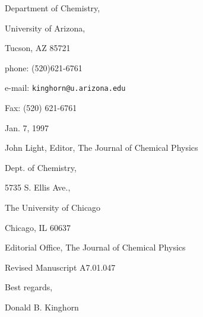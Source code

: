 \documentclass[12pt]{article}
\begin{document}
\begin{letterfrom}
\end{letterfrom}

\begin{letterfromcompany}
\end{letterfromcompany}

\begin{letterfromaddr}
Department of Chemistry,

University of Arizona,

Tucson, AZ 85721\newline

phone: (520)621-6761

e-mail: \texttt{kinghorn@u.arizona.edu}

Fax: (520) 621-6761
\end{letterfromaddr}

\begin{letterdate}
Jan. 7, 1997
\end{letterdate}

\begin{letterto}
\end{letterto}

\begin{lettertoaddr}
John Light, Editor, The Journal of Chemical Physics

Dept. of Chemistry,

5735 S. Ellis Ave.,

The University of Chicago

Chicago, IL 60637
\end{lettertoaddr}

\begin{letterattention}
Editorial Office, The Journal of Chemical Physics
\end{letterattention}

\begin{lettersubj}
Revised Manuscript A7.01.047
\end{lettersubj}

\begin{letterclosing}
Best regards,
\end{letterclosing}

\begin{lettersign}
Donald B. Kinghorn
\end{lettersign}

\begin{letterps}
\end{letterps}

\begin{letterinitials}
\end{letterinitials}
\end{document}

